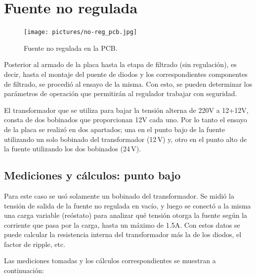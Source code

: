 \documentclass[chaptersright]{informeutn}
\begin{document}
    \section{Fuente no regulada}
      \begin{figure}
        \centering
        \vspace{-5mm}
        \texttt{[image: pictures/no-reg\_pcb.jpg]}
        \caption{Fuente no regulada en la PCB.}
      \end{figure}
      Posterior al armado de la placa hasta la etapa de filtrado (sin regulación), es decir, hasta el montaje del
      puente de diodos y los correspondientes componentes de filtrado, se procedió al ensayo de la misma. Con esto,
      se pueden determinar los parámetros de operación que permitirán al regulador trabajar con seguridad.

      El transformador que se utiliza para bajar la tensión alterna de 220V a 12+12V, consta de dos bobinados que
      proporcionan 12V cada uno. Por lo tanto el ensayo de la placa se realizó en dos apartados; una en el punto bajo
      de la fuente utilizando un solo bobinado del transformador (12\,V) y, otro en el punto alto de la fuente utilizando
      los dos bobinados (24\,V).

      \subsection{Mediciones y cálculos: punto bajo}
        Para este caso se usó solamente un bobinado del transformador. Se midió la tensión de salida de la fuente no
        regulada en vacío, y luego se conectó a la misma una carga variable (reóstato) para analizar qué tensión
        otorga la fuente según la corriente que pasa por la carga, hasta un máximo de 1.5A. Con estos datos se puede
        calcular la resistencia interna del transformador más la de los diodos, el factor de ripple, etc.

        Las mediciones tomadas y los cálculos correspondientes se muestran a continuación:
\end{document}
